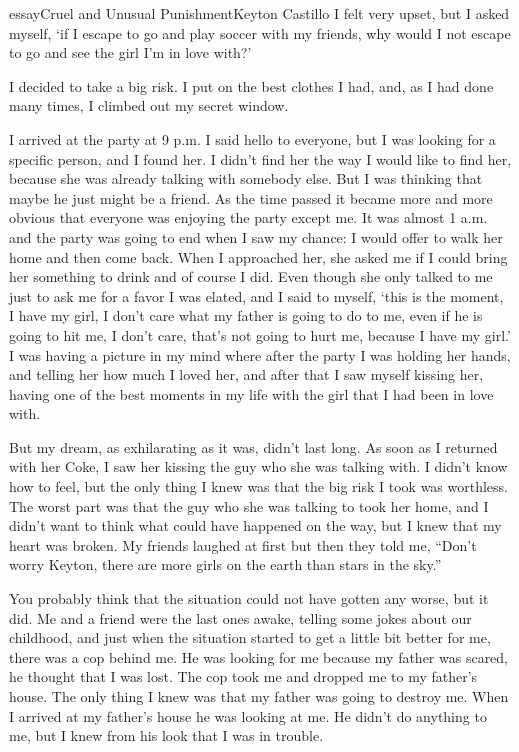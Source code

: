 \begin{prose}{essay}{Cruel and Unusual Punishment}{Keyton Castillo}
I felt very upset, but I asked myself,  `if I escape to go and play soccer with my friends, why would I not escape to go and see the girl I'm in love with?'\par
I decided to take a big risk. I put on the best clothes I had, and, as I had done many times, I climbed out my secret window.\par
I arrived at the party at 9 p.m. I said hello to everyone, but I was looking for a specific person, and I found her. I didn't find her the way I would like to find her, because she was already talking with somebody else. But I was thinking that maybe he just might be a friend. As the time passed it became more and more obvious that everyone was enjoying the party except me. It was almost 1 a.m. and the party was going to end when I saw my chance: I would offer to walk her home and then come back. When I approached her, she asked me if I could bring her something to drink and of course I did.  Even though she only talked to me just to ask me for a favor I was elated, and I said to myself, `this is the moment, I have my girl, I don't care what my father is going to do to me, even if he is going to hit me, I don't care, that's not going to hurt me, because I have my girl.' I was having a picture in my mind where after the party I was holding her hands, and telling her how much I loved her, and after that I saw myself kissing her, having one of the best moments in my life with the girl that I had been in love with.               \par
But my dream, as exhilarating as it was, didn't last long. As soon as I returned with her Coke, I saw her kissing the guy who she was talking with. I didn't know how to feel, but the only thing I knew was that the big risk I took was worthless. The worst part was that the guy who she was talking to took her home, and I didn't want to think what could have happened on the way, but I knew that my heart was broken. My friends laughed at first but then they told me, “Don't worry Keyton, there are more girls on the earth than stars in the sky.” \par
You probably think that the situation could not have gotten any worse, but it did. Me and a friend were the last ones awake, telling some jokes about our childhood, and just when the situation started to get a little bit better for me, there was a cop behind me. He was looking for me because my father was scared, he thought that I was lost. The cop took me and dropped me to my father's house. The only thing I knew was that my father was going to destroy me. When I arrived at my father's house he was looking at me. He didn't do anything to me, but I knew from his look that I was in trouble. \par

\end{prose}
